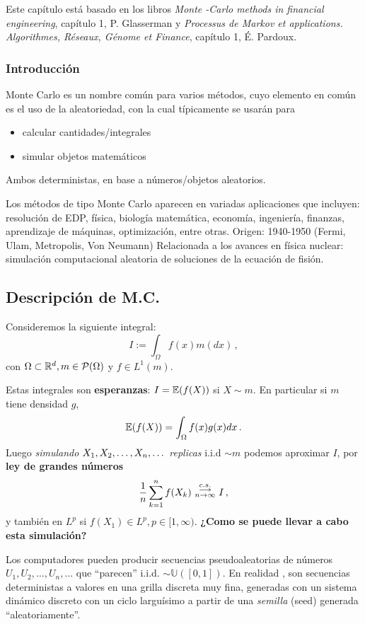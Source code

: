 Este capítulo está basado en los libros \textit{Monte -Carlo methods in financial engineering}, capítulo 1, P. Glasserman \cite{glass} y \textit{Processus de Markov et applications. Algorithmes, Réseaux, Génome et Finance}, capítulo 1, É. Pardoux\cite{pardoux}.
\subsubsection{Introducción}
Monte Carlo es un nombre común para varios métodos, cuyo elemento en común es el uso de la aleatoriedad, con la cual típicamente se usarán para  %
\begin{itemize}
    \item calcular cantidades/integrales
    \item simular objetos matemáticos
\end{itemize}
Ambos deterministas, en base a números/objetos aleatorios.

\newp Los métodos de tipo Monte Carlo aparecen en variadas aplicaciones que incluyen: resolución de EDP, física, biología matemática, economía, ingeniería, finanzas, aprendizaje de máquinas, optimización, entre otras.
\newp Origen: 1940-1950 (Fermi, Ulam, Metropolis, Von Neumann) Relacionada a los avances en física nuclear: simulación computacional aleatoria de soluciones de la ecuación de fisión. 
\subsection{Descripción de M.C.}
\newp Consideremos la siguiente integral:
$$ I:=\displaystyle\int_\Omega f(x)m(dx) \, ,$$
con $\Omega\subset\mathbb{R}^d,m\in\mathcal{P}(\Omega)$ y $f\in L^1(m)$.

Estas integrales son \textbf{esperanzas}: $I=\mathbb{E}(f(X))$ si $X\sim m$.
En particular si $m$ tiene densidad $g$,
$$ \mathbb{E}(f(X)) = \displaystyle \int_\Omega f(x)g(x)dx \, .$$
Luego \textit{simulando} $X_1,X_2,\dots,X_n,\dots$ \textit{replicas} i.i.d $\sim m$ podemos aproximar $I$, por \textbf{ley de grandes números}
$$ \displaystyle\frac{1}{n}\sum^n_{k=1}f(X_k)\mbox{ }\overset{c.s.}{\substack{\longrightarrow \\n \to \infty}}\mbox{ } I \, ,$$
y también en $L^p$ si $f(X_1)\in L^p, p\in[1,\infty)$.
\newp \textbf{¿Como se puede llevar a cabo esta simulación?}

Los computadores pueden producir secuencias pseudoaleatorias de números $U_1,U_2,\dots,U_n,\dots$ que ``parecen'' i.i.d. $\sim \mathbb{U}([0,1])$. En realidad , son secuencias deterministas a valores en una grilla discreta muy fina, generadas con un sistema dinámico discreto con un ciclo larguísimo a partir de una \textit{semilla} (seed) generada ``aleatoriamente''.

